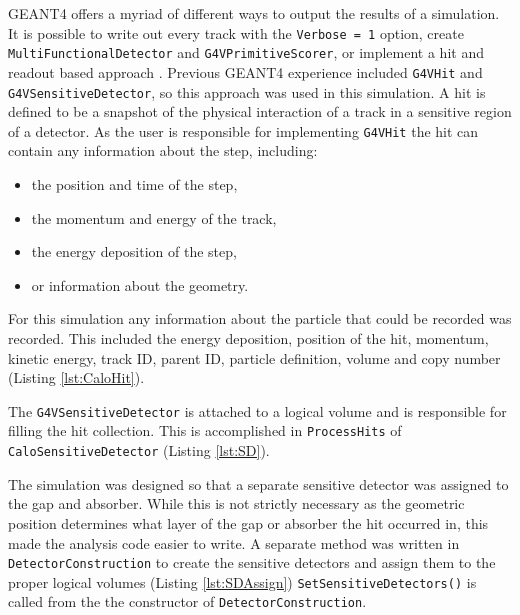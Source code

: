 GEANT4 offers a myriad of different ways to output the results of a simulation.
It is possible to write out every track with the \verb+Verbose = 1+ option, create \verb+MultiFunctionalDetector+ and \verb+G4VPrimitiveScorer+, or implement a hit and readout based approach \cite{cern_detector_2012}.
Previous GEANT4 experience included \verb+G4VHit+ and \verb+G4VSensitiveDetector+, so this approach was used in this simulation. 
A hit is defined to be a snapshot of the physical interaction of a track in a sensitive region of a detector.
As the user is responsible for implementing \verb+G4VHit+ the hit can contain any information about the step, including:
\begin{itemize}
	\item the position and time of the step,
	\item the momentum and energy of the track,
	\item the energy deposition of the step,
	\item or information about the geometry.
\end{itemize}
For this simulation any information about the particle that could be recorded was recorded. 
This included the energy deposition, position of the hit, momentum, kinetic energy, track ID, parent ID, particle definition, volume and copy number (Listing \ref{lst:CaloHit}).

The \verb+G4VSensitiveDetector+ is attached to a logical volume and is responsible for filling the hit collection.
This is accomplished in \verb+ProcessHits+ of \verb+CaloSensitiveDetector+ (Listing \ref{lst:SD}).

The simulation was designed so that a separate sensitive detector was assigned to the gap and absorber.
While this is not strictly necessary as the geometric position determines what layer of the gap or absorber the hit occurred in, this made the analysis code easier to write.
A separate method was written in \verb+DetectorConstruction+ to create the sensitive detectors and assign them to the proper logical volumes (Listing \ref{lst:SDAssign})
\verb+SetSensitiveDetectors()+ is called from the the constructor of \verb+DetectorConstruction+.



